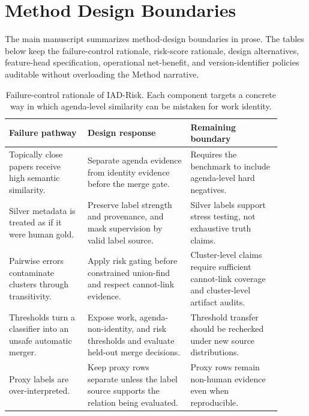 \documentclass[11pt]{article}
\begin{document}
\section{Method Design Boundaries}

The main manuscript summarizes method-design boundaries in prose. The tables below keep the failure-control rationale, risk-score rationale, design alternatives, feature-head specification, operational net-benefit, and version-identifier policies auditable without overloading the Method narrative.

\begin{table}[H]
\caption{Failure-control rationale of IAD-Risk. Each component targets a concrete way in which agenda-level similarity can be mistaken for work identity.}
\label{tab:failure-controls}
\centering
\small
\begin{tabular}{L{0.26\linewidth}L{0.34\linewidth}L{0.30\linewidth}}
\toprule
Failure pathway & Design response & Remaining boundary \\
\midrule
Topically close papers receive high semantic similarity. & Separate agenda evidence from identity evidence before the merge gate. & Requires the benchmark to include agenda-level hard negatives. \\
Silver metadata is treated as if it were human gold. & Preserve label strength and provenance, and mask supervision by valid label source. & Silver labels support stress testing, not exhaustive truth claims. \\
Pairwise errors contaminate clusters through transitivity. & Apply risk gating before constrained union-find and respect cannot-link evidence. & Cluster-level claims require sufficient cannot-link coverage and cluster-level artifact audits. \\
Thresholds turn a classifier into an unsafe automatic merger. & Expose work, agenda-non-identity, and risk thresholds and evaluate held-out merge decisions. & Threshold transfer should be rechecked under new source distributions. \\
Proxy labels are over-interpreted. & Keep proxy rows separate unless the label source supports the relation being evaluated. & Proxy rows remain non-human evidence even when reproducible. \\
\bottomrule
\end{tabular}
\end{table}
\end{document}
